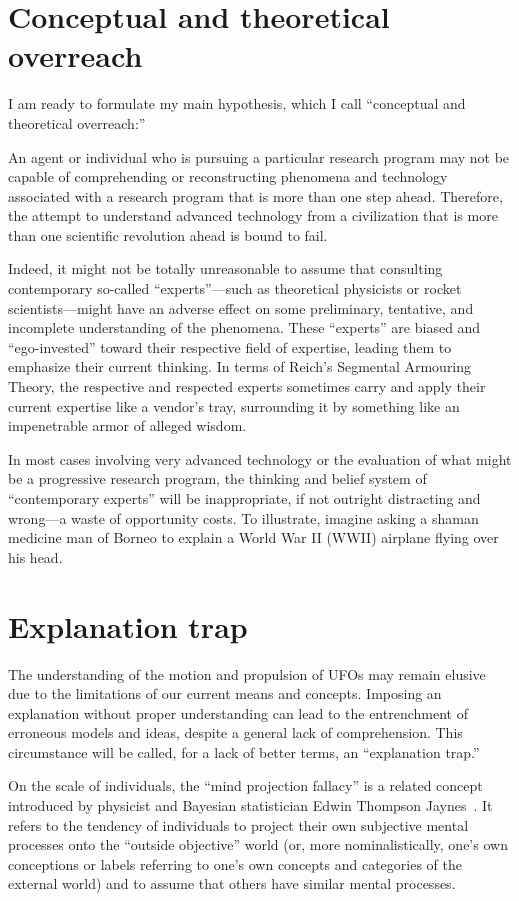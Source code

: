 \section{Conceptual and theoretical overreach}

I am ready to formulate my main hypothesis, which I call ``conceptual and theoretical overreach:''
\begin{svgraybox}
An agent or individual who is pursuing a particular research program may not be capable of comprehending or reconstructing phenomena and technology associated with a research program that is more than one step ahead. Therefore, the attempt to understand advanced technology from a civilization that is more than one scientific revolution ahead is bound to fail.
\end{svgraybox}
\noindent Indeed, it might not be totally unreasonable to assume that consulting contemporary so-called ``experts''---such as
theoretical physicists or rocket scientists---might have an adverse effect on some preliminary, tentative,
and incomplete understanding of the phenomena. These ``experts'' are biased and ``ego-invested''
toward their respective field of expertise, leading them to emphasize their current thinking.
In terms of Reich's Segmental Armouring Theory, the respective and respected experts sometimes carry and apply their current expertise like a vendor's tray, surrounding it by something like an impenetrable armor of alleged wisdom.

In most cases involving very advanced technology or the evaluation of what might be a progressive research program,
the thinking and belief system of ``contemporary experts'' will be inappropriate, if not outright distracting and
wrong---a waste of opportunity costs. To illustrate, imagine asking a shaman medicine man of Borneo to explain a World War II (WWII) airplane flying over his head.

\section{Explanation trap}

The understanding of the motion and propulsion of UFOs may remain elusive due to the limitations of our current means and concepts. Imposing an explanation without proper understanding can lead to the entrenchment of erroneous models and ideas, despite a general lack of comprehension. This circumstance will be called, for a lack of better terms, an ``explanation trap.''

On the scale of individuals, the ``mind projection fallacy'' is a related concept introduced by physicist and
Bayesian statistician Edwin Thompson Jaynes~\cite{jaynes-89}.
It refers to the tendency of individuals to project their own subjective
mental processes onto the ``outside objective'' world
(or, more nominalistically, one's own conceptions or labels referring
to one's own concepts and categories of the external world)
and to assume that others have similar mental processes.

